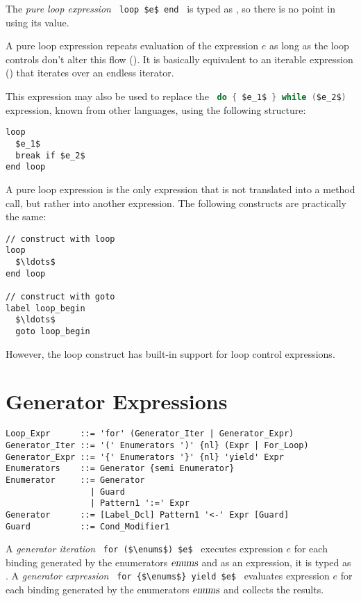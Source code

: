 The {\em pure loop expression} ~\lstinline!loop $e$ end!~ is typed as , so there is no point in using its value. 

A pure loop expression repeats evaluation of the expression $e$ as long as the loop controls don't alter this flow (). It is basically equivalent to an iterable expression () that iterates over an endless iterator. 

This expression may also be used to replace the ~\lstinline[language=Java]!do { $e_1$ } while ($e_2$)!~ expression, known from other languages, using the following structure: 
\begin{lstlisting}
loop
  $e_1$
  break if $e_2$
end loop
\end{lstlisting}

A pure loop expression is the only expression that is not translated into a method call, but rather into another expression. The following constructs are practically the same: 
\begin{lstlisting}
// construct with loop
loop
  $\ldots$
end loop

// construct with goto
label loop_begin
  $\ldots$
  goto loop_begin
\end{lstlisting}
However, the loop construct has built-in support for loop control expressions. 





\section{Generator Expressions}
\label{sec:generator-expressions}

\syntax\begin{lstlisting}
Loop_Expr      ::= 'for' (Generator_Iter | Generator_Expr)
Generator_Iter ::= '(' Enumerators ')' {nl} (Expr | For_Loop)
Generator_Expr ::= '{' Enumerators '}' {nl} 'yield' Expr
Enumerators    ::= Generator {semi Enumerator}
Enumerator     ::= Generator
                 | Guard
                 | Pattern1 ':=' Expr
Generator      ::= [Label_Dcl] Pattern1 '<-' Expr [Guard]
Guard          ::= Cond_Modifier1
\end{lstlisting}

A {\em generator iteration} ~\lstinline!for ($\enums$) $e$!~ executes expression $e$ for each binding generated by the enumerators $\mbox{\sl enums}$ and as an expression, it is typed as . A {\em generator expression} ~\lstinline!for {$\enums$} yield $e$!~ evaluates expression $e$ for each binding generated by the enumerators $\mbox{\sl enums}$ and collects the results.

